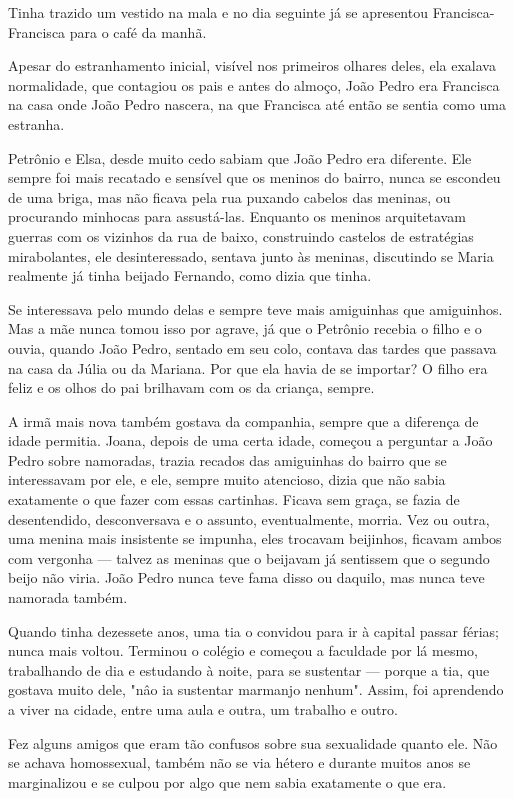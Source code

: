 \documentclass[11pt,a4paper,twoside,openany]{book}
\begin{document}
Tinha trazido um vestido na mala e no dia seguinte já se apresentou Francisca-Francisca para o café da manhã.

Apesar do estranhamento inicial, visível nos primeiros olhares deles, ela exalava normalidade, que contagiou os pais e antes do almoço, João Pedro era Francisca na casa onde João Pedro nascera, na que Francisca até então se sentia como uma estranha.

Petrônio e Elsa, desde muito cedo sabiam que João Pedro era diferente. Ele sempre foi mais recatado e sensível que os meninos do bairro, nunca se escondeu de uma briga, mas não ficava pela rua puxando cabelos das meninas, ou procurando minhocas para assustá-las. Enquanto os meninos arquitetavam guerras com os vizinhos da rua de baixo, construindo castelos de estratégias mirabolantes, ele desinteressado, sentava junto às meninas, discutindo se Maria realmente já tinha beijado Fernando, como dizia que tinha.

Se interessava pelo mundo delas e sempre teve mais amiguinhas que amiguinhos. Mas a mãe nunca tomou isso por agrave, já que o Petrônio recebia o filho e o ouvia, quando João Pedro, sentado em seu colo, contava das tardes que passava na casa da Júlia ou da Mariana. Por que ela havia de se importar? O filho era feliz e os olhos do pai brilhavam com os da criança, sempre.

A irmã mais nova também gostava da companhia, sempre que a diferença de idade permitia. Joana, depois de uma certa idade, começou a perguntar a João Pedro sobre namoradas, trazia recados das amiguinhas do bairro que se interessavam por ele, e ele, sempre muito atencioso, dizia que não sabia exatamente o que fazer com essas cartinhas. Ficava sem graça, se fazia de desentendido, desconversava e o assunto, eventualmente, morria. Vez ou outra, uma menina mais insistente se impunha, eles trocavam beijinhos, ficavam ambos com vergonha --- talvez as meninas que o beijavam já sentissem que o segundo beijo não viria. João Pedro nunca teve fama disso ou daquilo, mas nunca teve namorada também.

Quando tinha dezessete anos, uma tia o convidou para ir à capital passar férias; nunca mais voltou. Terminou o colégio e começou a faculdade por lá mesmo, trabalhando de dia e estudando à noite, para se sustentar --- porque a tia, que gostava muito dele, "nâo ia sustentar marmanjo nenhum". Assim, foi aprendendo a viver na cidade, entre uma aula e outra, um trabalho e outro.

Fez alguns amigos que eram tão confusos sobre sua sexualidade quanto ele. Não se achava homossexual, também não se via hétero e durante muitos anos se marginalizou e se culpou por algo que nem sabia exatamente o que era.
\end{document}
